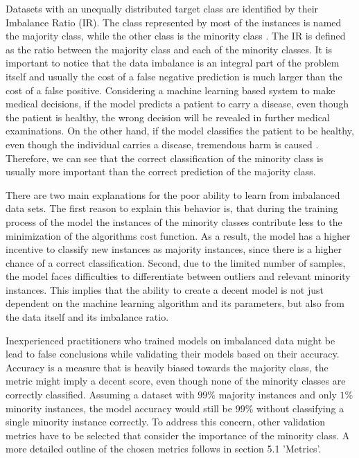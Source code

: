 \documentclass[parskip=full]{scrartcl}
\begin{document}
Datasets with an unequally distributed target class are identified by their
Imbalance Ratio (IR). The class represented by most of the instances is named
the majority class, while the other class is the minority class
\cite{Chawla2003}. The IR is defined as the ratio between the majority class and
each of the minority classes. It is important to notice that the data imbalance
is an integral part of the problem itself and usually the cost of a false
negative prediction is much larger than the cost of a false positive.
Considering a machine learning based system to make medical decisions, if the
model predicts a patient to carry a disease, even though the patient is healthy,
the wrong decision will be revealed in further medical examinations. On the
other hand, if the model classifies the patient to be healthy, even though the
individual carries a disease, tremendous harm is caused
\cite{Wan2014LearningTI}. Therefore, we can see that the correct classification
of the minority class is usually more important than the correct prediction of
the majority class.

There are two main explanations for the poor ability to learn from imbalanced
data sets. The first reason to explain this behavior is, that during the
training process of the model the instances of the minority classes contribute
less to the minimization of the algorithms cost function. As a result, the model
has a higher incentive to classify new instances as majority instances, since
there is a higher chance of a correct classification. Second, due to the limited
number of samples, the model faces difficulties to differentiate between
outliers and relevant minority instances. This implies that the ability to
create a decent model is not just dependent on the machine learning algorithm
and its parameters, but also from the data itself and its imbalance ratio.

Inexperienced practitioners who trained models on imbalanced data might be lead to
false conclusions while validating their models based on their accuracy.
Accuracy is a measure that is heavily biased towards the majority class, the
metric might imply a decent score, even though none of the minority classes are
correctly classified. Assuming a dataset with \( 99\% \)  majority instances and
only \( 1\% \) minority instances, the model accuracy would still be \( 99\% \)
without classifying a single minority instance correctly. To address this
concern, other validation metrics have to be selected that consider the
importance of the minority class. A more detailed outline of the chosen metrics
follows in section 5.1 'Metrics'.
\end{document}
